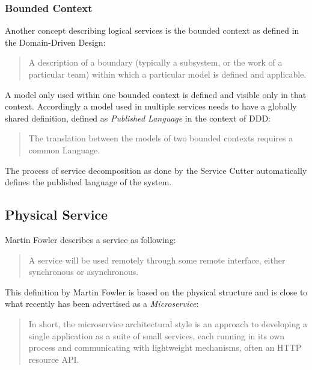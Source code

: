 \subsubsection{Bounded Context}

Another concept describing logical services is the bounded context as defined in the Domain-Driven Design:\cite{evans2014domain}

\begin{quotation}
	A description of a boundary (typically a subsystem, or the work of a particular team) within which a particular model is defined and applicable.
\end{quotation}

A model only used within one bounded context is defined and visible only in that context. Accordingly a model used in multiple services needs to have a globally shared definition, defined as \textit{Published Language} in the context of \gls{DDD}\cite{evans2014domain}:

\begin{quotation}
	The translation between the models of two bounded contexts requires a common Language.
\end{quotation}

The process of service decomposition as done by the Service Cutter automatically defines the published language of the system. 

\subsection{Physical Service}

Martin Fowler describes a service as following:

\begin{quotation}
	A service will be used remotely through some remote interface, either synchronous or asynchronous.\cite{fowlerIoC}
\end{quotation}

This definition by Martin Fowler is based on the physical structure and is close to what recently has been advertised as a \textit{Microservice}:

\begin{quotation}
	In short, the microservice architectural style is an approach to developing a single application as a suite of small services, each running in its own process and communicating with lightweight mechanisms, often an HTTP resource API.\cite{fowlerMicroservice}
\end{quotation}


